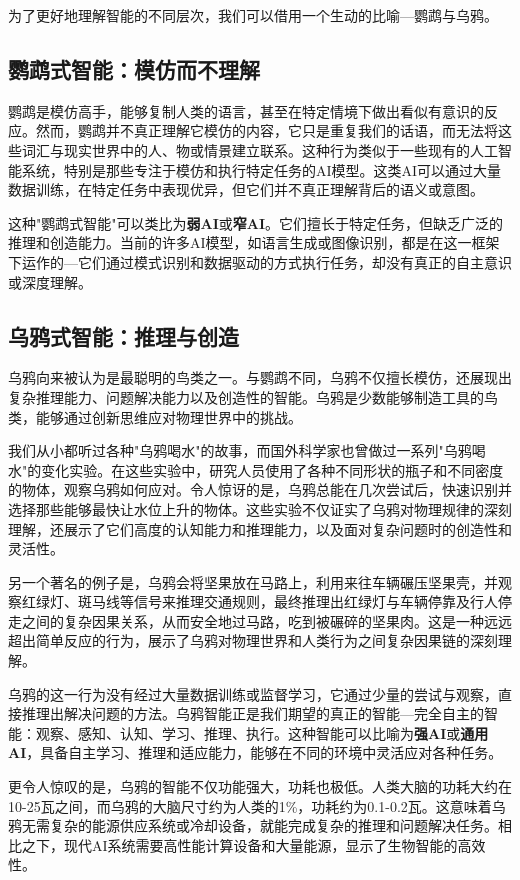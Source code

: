 为了更好地理解智能的不同层次，我们可以借用一个生动的比喻---鹦鹉与乌鸦。

\subsection*{鹦鹉式智能：模仿而不理解}
鹦鹉是模仿高手，能够复制人类的语言，甚至在特定情境下做出看似有意识的反应。然而，鹦鹉并不真正理解它模仿的内容，它只是重复我们的话语，而无法将这些词汇与现实世界中的人、物或情景建立联系。这种行为类似于一些现有的人工智能系统，特别是那些专注于模仿和执行特定任务的AI模型。这类AI可以通过大量数据训练，在特定任务中表现优异，但它们并不真正理解背后的语义或意图。

这种"鹦鹉式智能"可以类比为{\bf 弱AI}或{\bf 窄AI}。它们擅长于特定任务，但缺乏广泛的推理和创造能力。当前的许多AI模型，如语言生成或图像识别，都是在这一框架下运作的---它们通过模式识别和数据驱动的方式执行任务，却没有真正的自主意识或深度理解。

\subsection*{乌鸦式智能：推理与创造}

乌鸦向来被认为是最聪明的鸟类之一。与鹦鹉不同，乌鸦不仅擅长模仿，还展现出复杂推理能力、问题解决能力以及创造性的智能。乌鸦是少数能够制造工具的鸟类，能够通过创新思维应对物理世界中的挑战。

我们从小都听过各种"乌鸦喝水"的故事，而国外科学家也曾做过一系列"乌鸦喝水"的变化实验。在这些实验中，研究人员使用了各种不同形状的瓶子和不同密度的物体，观察乌鸦如何应对。令人惊讶的是，乌鸦总能在几次尝试后，快速识别并选择那些能够最快让水位上升的物体。这些实验不仅证实了乌鸦对物理规律的深刻理解，还展示了它们高度的认知能力和推理能力，以及面对复杂问题时的创造性和灵活性。

另一个著名的例子是，乌鸦会将坚果放在马路上，利用来往车辆碾压坚果壳，并观察红绿灯、斑马线等信号来推理交通规则，最终推理出红绿灯与车辆停靠及行人停走之间的复杂因果关系，从而安全地过马路，吃到被碾碎的坚果肉。这是一种远远超出简单反应的行为，展示了乌鸦对物理世界和人类行为之间复杂因果链的深刻理解。

乌鸦的这一行为没有经过大量数据训练或监督学习，它通过少量的尝试与观察，直接推理出解决问题的方法。乌鸦智能正是我们期望的真正的智能---完全自主的智能：观察、感知、认知、学习、推理、执行。这种智能可以比喻为{\bf 强AI}或{\bf 通用AI}，具备自主学习、推理和适应能力，能够在不同的环境中灵活应对各种任务。

更令人惊叹的是，乌鸦的智能不仅功能强大，功耗也极低。人类大脑的功耗大约在10-25瓦之间，而乌鸦的大脑尺寸约为人类的1\%，功耗约为0.1-0.2瓦。这意味着乌鸦无需复杂的能源供应系统或冷却设备，就能完成复杂的推理和问题解决任务。相比之下，现代AI系统需要高性能计算设备和大量能源，显示了生物智能的高效性。

